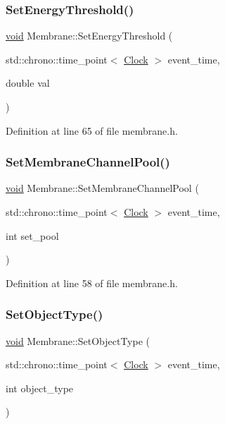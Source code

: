 \subsubsection{\texorpdfstring{Set\+Energy\+Threshold()}{SetEnergyThreshold()}}
{\footnotesize\ttfamily \mbox{\hyperlink{glad_8h_a950fc91edb4504f62f1c577bf4727c29}{void}} Membrane\+::\+Set\+Energy\+Threshold (\begin{DoxyParamCaption}\item[{std\+::chrono\+::time\+\_\+point$<$ \mbox{\hyperlink{universe_8h_a0ef8d951d1ca5ab3cfaf7ab4c7a6fd80}{Clock}} $>$}]{event\+\_\+time,  }\item[{double}]{val }\end{DoxyParamCaption})\hspace{0.3cm}{\ttfamily [inline]}}



Definition at line 65 of file membrane.\+h.

\mbox{\label{class_membrane_aeda845ea9577e6a07690acad22ef375f}} 
\subsubsection{\texorpdfstring{Set\+Membrane\+Channel\+Pool()}{SetMembraneChannelPool()}}
{\footnotesize\ttfamily \mbox{\hyperlink{glad_8h_a950fc91edb4504f62f1c577bf4727c29}{void}} Membrane\+::\+Set\+Membrane\+Channel\+Pool (\begin{DoxyParamCaption}\item[{std\+::chrono\+::time\+\_\+point$<$ \mbox{\hyperlink{universe_8h_a0ef8d951d1ca5ab3cfaf7ab4c7a6fd80}{Clock}} $>$}]{event\+\_\+time,  }\item[{int}]{set\+\_\+pool }\end{DoxyParamCaption})\hspace{0.3cm}{\ttfamily [inline]}}



Definition at line 58 of file membrane.\+h.

\mbox{\label{class_membrane_a5ba2bcb906f3984b28f1030207e106ad}} 
\subsubsection{\texorpdfstring{Set\+Object\+Type()}{SetObjectType()}}
{\footnotesize\ttfamily \mbox{\hyperlink{glad_8h_a950fc91edb4504f62f1c577bf4727c29}{void}} Membrane\+::\+Set\+Object\+Type (\begin{DoxyParamCaption}\item[{std\+::chrono\+::time\+\_\+point$<$ \mbox{\hyperlink{universe_8h_a0ef8d951d1ca5ab3cfaf7ab4c7a6fd80}{Clock}} $>$}]{event\+\_\+time,  }\item[{int}]{object\+\_\+type }\end{DoxyParamCaption})}



